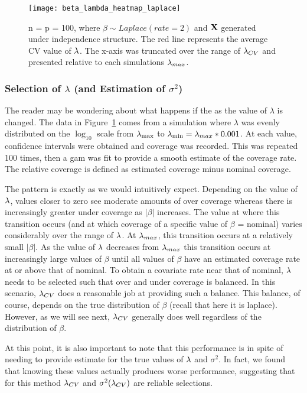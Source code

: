 \begin{figure}
  \texttt{[image: beta\_lambda\_heatmap\_laplace]}
  \caption{\label{Fig:beta_lambda_heatmap_laplace} n = p = 100, where $\beta \sim Laplace(rate = 2)$ and $\mathbf{X}$ generated under independence structure. The red line represents the average CV value of $\lambda$. The x-axis was truncated over the range of $\lambda_{CV}$ and presented relative to each simulations $\lambda_{max}$.}
\end{figure}

\subsubsection{Selection of \texorpdfstring{$\lambda$}{lambda} (and Estimation of \texorpdfstring{$\sigma^2$}{sigma squared})}

The reader may be wondering about what happens if the as the value of $\lambda$ is changed. The data in Figure~\ref{Fig:beta_lambda_heatmap_laplace} comes from a simulation where $\lambda$ was evenly distributed on the $\log_{10}$ scale from $\lambda_{\max}$ to $\lambda_{\min} = \lambda_{max} * 0.001$. At each value, confidence intervals were obtained and coverage was recorded. This was repeated 100 times, then a gam was fit to provide a smooth estimate of the coverage rate. The relative coverage is defined as estimated coverage minus nominal coverage.

The pattern is exactly as we would intuitively expect. Depending on the value of $\lambda$, values closer to zero see moderate amounts of over coverage whereas there is increasingly greater under coverage as $|\beta|$ increases. The value at where this transition occurs (and at which coverage of a specific value of $\beta$ = nominal) varies considerably over the range of $\lambda$. At $\lambda_{max}$, this transition occurs at a relatively small $|\beta|$. As the value of $\lambda$ decreases from $\lambda_{max}$ this transition occurs at increasingly large values of $\beta$ until all values of $\beta$ have an estimated coverage rate at or above that of nominal. To obtain a covariate rate near that of nominal, $\lambda$ needs to be selected such that over and under coverage is balanced. In this scenario, $\lambda_{CV}$ does a reasonable job at providing such a balance. This balance, of course, depends on the true distribution of $\beta$ (recall that here it is laplace). However, as we will see next, $\lambda_{CV}$ generally does well regardless of the distribution of $\beta$.

At this point, it is also important to note that this performance is in spite of needing to provide estimate for the true values of $\lambda$ and $\sigma^2$. In fact, we found that knowing these values actually produces worse performance, suggesting that for this method $\lambda_{CV}$ and $\sigma^2(\lambda_{CV})$ are reliable selections.

